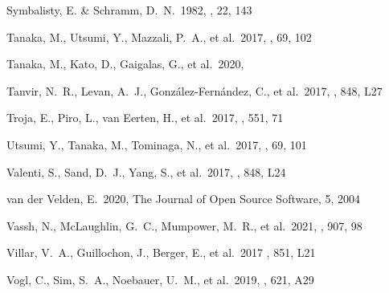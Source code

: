 \documentclass[twocolumn, twocolappendix]{aastex63}
\begin{document}
\begin{thebibliography}{}
 Symbalisty, E. \& Schramm, D.~N.\ 1982, \aplett, 22, 143






 Tanaka, M., Utsumi, Y., Mazzali, P.~A., et al.\ 2017, \pasj, 69, 102




 Tanaka, M., Kato, D., Gaigalas, G., et al.\ 2020, \mnras


 Tanvir, N.~R., Levan, A.~J., Gonz{\'a}lez-Fern{\'a}ndez, C., et al.\ 2017, \apjl, 848, L27




 Troja, E., Piro, L., van Eerten, H., et al.\ 2017, \nat, 551, 71


 Utsumi, Y., Tanaka, M., Tominaga, N., et al.\ 2017, \pasj, 69, 101


 Valenti, S., Sand, D.~J., Yang, S., et al.\ 2017, \apjl, 848, L24


 van der Velden, E.\ 2020, The Journal of Open Source Software, 5, 2004


 Vassh, N., McLaughlin, G.~C., Mumpower, M.~R., et al.\ 2021, \apj, 907, 98


Villar, V.~A., Guillochon, J., Berger, E., et al.\ 2017 \aj, 851, L21




 Vogl, C., Sim, S.~A., Noebauer, U.~M., et al.\ 2019, \aap, 621, A29



\end{thebibliography}
\end{document}
